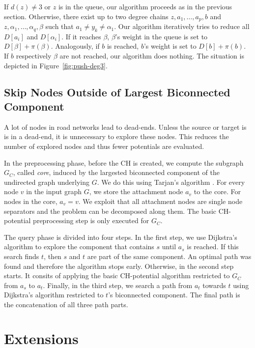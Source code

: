 \documentclass[sigconf]{acmart}
\begin{document}
If $d(z)\neq 3$ or $z$ is in the queue, our algorithm proceeds as in the previous section.
Otherwise, there exist up to two degree chains $z,a_1,\ldots,a_p,b$ and $z,\alpha_1,\ldots,\alpha_q,\beta$ such that $a_1\neq y_k \neq \alpha_1$.
Our algorithm iteratively tries to reduce all $D[a_i]$ and $D[\alpha_i]$.
If it reaches $\beta$, $\beta$'s weight in the queue is set to $D[\beta]+\pi(\beta)$.
Analogously, if $b$ is reached, $b$'s weight is set to $D[b]+\pi(b)$.
If $b$ respectively $\beta$ are not reached, our algorithm does nothing.
The situation is depicted in Figure~\ref{fig:push-deg3}.

\subsection{Skip Nodes Outside of Largest Biconnected Component}

\label{sec:largested-biconnected-component}

A lot of nodes in road networks lead to dead-ends.
Unless the source or target is is in a dead-end, it is unnecessary to explore these nodes.
This reduces the number of explored nodes and thus fewer potentials are evaluated.

In the preprocessing phase, before the CH is created, we compute the subgraph $G_C$, called \emph{core}, induced by the largested biconnected component of the undirected graph underlying $G$.
We do this using Tarjan's algorithm \cite{t-dfslg2-72}.
For every node $v$ in the input graph $G$, we store the attachment node $a_v$ to the core.
For nodes in the core, $a_v=v$.
We exploit that all attachment nodes are single node separators and the problem can be decomposed along them.
The basic CH-potential preprocessing step is only executed for $G_C$.

The query phase is divided into four steps.
In the first step, we use Dijkstra's algorithm to explore the component that contains $s$ until $a_s$ is reached.
If this search finds $t$, then $s$ and $t$ are part of the same component.
An optimal path was found and therefore the algorithm stops early.
Otherwise, in the second step starts.
It consits of applying the basic CH-potential algorithm restricted to $G_C$ from $a_s$ to $a_t$.
Finally, in the third step, we search a path from $a_t$ towards $t$ using Dijkstra's algorithm restricted to $t$'s biconnected component.
The final path is the concatenation of all three path parts.


\section{Extensions}
\end{document}
